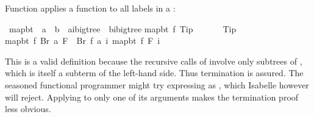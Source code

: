 \begin{isabellebody}
\begin{isamarkuptext}
Function  applies a function to all labels in a :%
\end{isamarkuptext}%
\isamarkuptrue%
\isamarkupfalse%
\ map{}bt\ {}{}\ {}{}{}a\ {}\ {}b{}\ {}\ {}{}a{}{}i{}bigtree\ {}\ {}{}b{}{}i{}bigtree{}\isanewline
{}\isanewline
{}map{}bt\ f\ Tip\ \ \ \ \ \ {}\ Tip{}\ {}\isanewline
{}map{}bt\ f\ {}Br\ a\ F{}\ {}\ Br\ {}f\ a{}\ {}{}i{}\ map{}bt\ f\ {}F\ i{}{}{}%
\begin{isamarkuptext}%
\noindent This is a valid  definition because the
recursive calls of  involve only subtrees of
, which is itself a subterm of the left-hand side. Thus termination
is assured.  The seasoned functional programmer might try expressing
 as , which Isabelle 
however will reject.  Applying  to only one of its arguments
makes the termination proof less obvious.


\end{isamarkuptext}
\end{isabellebody}
